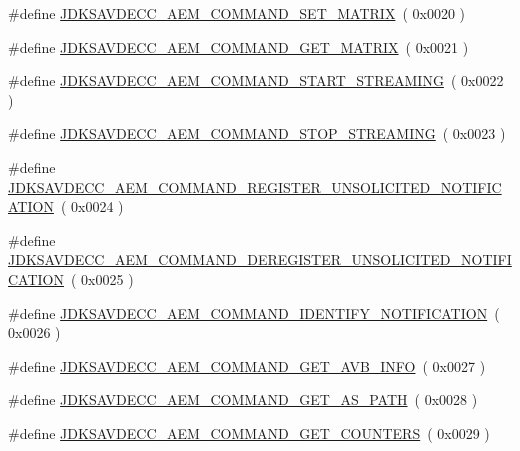 \begin{DoxyCompactItemize}
\item 
\#define \hyperlink{group__command_ga392a24c9293c9c6902fece36dbe62ded}{J\+D\+K\+S\+A\+V\+D\+E\+C\+C\+\_\+\+A\+E\+M\+\_\+\+C\+O\+M\+M\+A\+N\+D\+\_\+\+S\+E\+T\+\_\+\+M\+A\+T\+R\+IX}~( 0x0020 )
\item 
\#define \hyperlink{group__command_ga4a2c6d28628cd45f14e02f116fb19277}{J\+D\+K\+S\+A\+V\+D\+E\+C\+C\+\_\+\+A\+E\+M\+\_\+\+C\+O\+M\+M\+A\+N\+D\+\_\+\+G\+E\+T\+\_\+\+M\+A\+T\+R\+IX}~( 0x0021 )
\item 
\#define \hyperlink{group__command_ga02c5a086ab474b1e4d7786286811a680}{J\+D\+K\+S\+A\+V\+D\+E\+C\+C\+\_\+\+A\+E\+M\+\_\+\+C\+O\+M\+M\+A\+N\+D\+\_\+\+S\+T\+A\+R\+T\+\_\+\+S\+T\+R\+E\+A\+M\+I\+NG}~( 0x0022 )
\item 
\#define \hyperlink{group__command_ga662d8e95498967710f7f3a281987fd6c}{J\+D\+K\+S\+A\+V\+D\+E\+C\+C\+\_\+\+A\+E\+M\+\_\+\+C\+O\+M\+M\+A\+N\+D\+\_\+\+S\+T\+O\+P\+\_\+\+S\+T\+R\+E\+A\+M\+I\+NG}~( 0x0023 )
\item 
\#define \hyperlink{group__command_ga3e96622fb21f8a15740b8a3c6536dd00}{J\+D\+K\+S\+A\+V\+D\+E\+C\+C\+\_\+\+A\+E\+M\+\_\+\+C\+O\+M\+M\+A\+N\+D\+\_\+\+R\+E\+G\+I\+S\+T\+E\+R\+\_\+\+U\+N\+S\+O\+L\+I\+C\+I\+T\+E\+D\+\_\+\+N\+O\+T\+I\+F\+I\+C\+A\+T\+I\+ON}~( 0x0024 )
\item 
\#define \hyperlink{group__command_gaf60a3f35dcf29df8b09a17e9278952ae}{J\+D\+K\+S\+A\+V\+D\+E\+C\+C\+\_\+\+A\+E\+M\+\_\+\+C\+O\+M\+M\+A\+N\+D\+\_\+\+D\+E\+R\+E\+G\+I\+S\+T\+E\+R\+\_\+\+U\+N\+S\+O\+L\+I\+C\+I\+T\+E\+D\+\_\+\+N\+O\+T\+I\+F\+I\+C\+A\+T\+I\+ON}~( 0x0025 )
\item 
\#define \hyperlink{group__command_ga5bf2f499c3e8244b6bdf8c9d0ea12848}{J\+D\+K\+S\+A\+V\+D\+E\+C\+C\+\_\+\+A\+E\+M\+\_\+\+C\+O\+M\+M\+A\+N\+D\+\_\+\+I\+D\+E\+N\+T\+I\+F\+Y\+\_\+\+N\+O\+T\+I\+F\+I\+C\+A\+T\+I\+ON}~( 0x0026 )
\item 
\#define \hyperlink{group__command_ga0ef8e645e0859b9d44e25cf1cbd0ce60}{J\+D\+K\+S\+A\+V\+D\+E\+C\+C\+\_\+\+A\+E\+M\+\_\+\+C\+O\+M\+M\+A\+N\+D\+\_\+\+G\+E\+T\+\_\+\+A\+V\+B\+\_\+\+I\+N\+FO}~( 0x0027 )
\item 
\#define \hyperlink{group__command_gaeaf9337d60541d3ef6861dc2b1918600}{J\+D\+K\+S\+A\+V\+D\+E\+C\+C\+\_\+\+A\+E\+M\+\_\+\+C\+O\+M\+M\+A\+N\+D\+\_\+\+G\+E\+T\+\_\+\+A\+S\+\_\+\+P\+A\+TH}~( 0x0028 )
\item 
\#define \hyperlink{group__command_ga1cce6a5b14c1a00d2491799265ebfeb6}{J\+D\+K\+S\+A\+V\+D\+E\+C\+C\+\_\+\+A\+E\+M\+\_\+\+C\+O\+M\+M\+A\+N\+D\+\_\+\+G\+E\+T\+\_\+\+C\+O\+U\+N\+T\+E\+RS}~( 0x0029 )

\end{DoxyCompactItemize}
